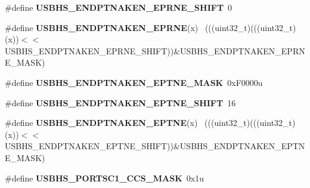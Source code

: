 \begin{DoxyCompactItemize}
\item 
\hypertarget{group___u_s_b_h_s___register___masks_ga649881cb2b1223b64595ab4b05a38045}{}\#define {\bfseries U\+S\+B\+H\+S\+\_\+\+E\+N\+D\+P\+T\+N\+A\+K\+E\+N\+\_\+\+E\+P\+R\+N\+E\+\_\+\+S\+H\+I\+F\+T}~0\label{group___u_s_b_h_s___register___masks_ga649881cb2b1223b64595ab4b05a38045}

\item 
\hypertarget{group___u_s_b_h_s___register___masks_ga9504d76fe7eba36ecde08fe5f41122b1}{}\#define {\bfseries U\+S\+B\+H\+S\+\_\+\+E\+N\+D\+P\+T\+N\+A\+K\+E\+N\+\_\+\+E\+P\+R\+N\+E}(x)                            ~(((uint32\+\_\+t)(((uint32\+\_\+t)(x))$<$$<$U\+S\+B\+H\+S\+\_\+\+E\+N\+D\+P\+T\+N\+A\+K\+E\+N\+\_\+\+E\+P\+R\+N\+E\+\_\+\+S\+H\+I\+F\+T))\&U\+S\+B\+H\+S\+\_\+\+E\+N\+D\+P\+T\+N\+A\+K\+E\+N\+\_\+\+E\+P\+R\+N\+E\+\_\+\+M\+A\+S\+K)\label{group___u_s_b_h_s___register___masks_ga9504d76fe7eba36ecde08fe5f41122b1}

\item 
\hypertarget{group___u_s_b_h_s___register___masks_ga4504ecfe2e6001b9361cc01736d8cf8b}{}\#define {\bfseries U\+S\+B\+H\+S\+\_\+\+E\+N\+D\+P\+T\+N\+A\+K\+E\+N\+\_\+\+E\+P\+T\+N\+E\+\_\+\+M\+A\+S\+K}~0x\+F0000u\label{group___u_s_b_h_s___register___masks_ga4504ecfe2e6001b9361cc01736d8cf8b}

\item 
\hypertarget{group___u_s_b_h_s___register___masks_gaf4147363d00bbbd025e1c8079cb10e95}{}\#define {\bfseries U\+S\+B\+H\+S\+\_\+\+E\+N\+D\+P\+T\+N\+A\+K\+E\+N\+\_\+\+E\+P\+T\+N\+E\+\_\+\+S\+H\+I\+F\+T}~16\label{group___u_s_b_h_s___register___masks_gaf4147363d00bbbd025e1c8079cb10e95}

\item 
\hypertarget{group___u_s_b_h_s___register___masks_ga473d32f4a1a6f8584277e0c8c61bbba2}{}\#define {\bfseries U\+S\+B\+H\+S\+\_\+\+E\+N\+D\+P\+T\+N\+A\+K\+E\+N\+\_\+\+E\+P\+T\+N\+E}(x)                            ~(((uint32\+\_\+t)(((uint32\+\_\+t)(x))$<$$<$U\+S\+B\+H\+S\+\_\+\+E\+N\+D\+P\+T\+N\+A\+K\+E\+N\+\_\+\+E\+P\+T\+N\+E\+\_\+\+S\+H\+I\+F\+T))\&U\+S\+B\+H\+S\+\_\+\+E\+N\+D\+P\+T\+N\+A\+K\+E\+N\+\_\+\+E\+P\+T\+N\+E\+\_\+\+M\+A\+S\+K)\label{group___u_s_b_h_s___register___masks_ga473d32f4a1a6f8584277e0c8c61bbba2}

\item 
\hypertarget{group___u_s_b_h_s___register___masks_ga8690b88ad3b2d17763a9692571af576c}{}\#define {\bfseries U\+S\+B\+H\+S\+\_\+\+P\+O\+R\+T\+S\+C1\+\_\+\+C\+C\+S\+\_\+\+M\+A\+S\+K}~0x1u\label{group___u_s_b_h_s___register___masks_ga8690b88ad3b2d17763a9692571af576c}


\end{DoxyCompactItemize}
